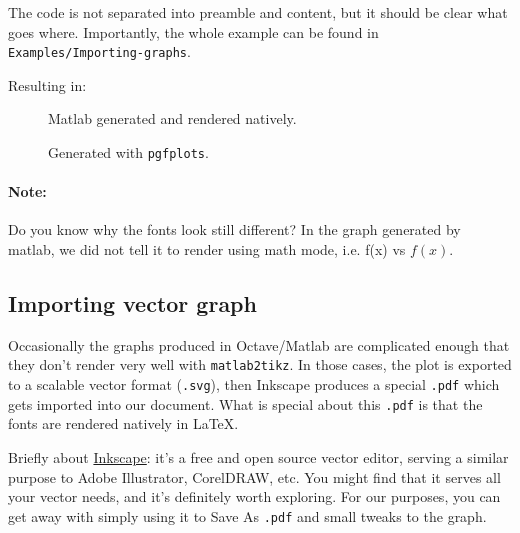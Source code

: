 The code is not separated into preamble and content, but it should be clear what goes where.
Importantly, the whole example can be found in \texttt{Examples/Importing-graphs}.

Resulting in:
\begin{figure}[h]\centering
\begin{minipage}{0.49\textwidth}
    \newlength\fheight{} \newlength\fwidth{}
    \setlength\fheight{5.5cm}
    \setlength\fwidth{7cm}    

\caption{Matlab generated and rendered natively.}
\end{minipage}
\hfill
\begin{minipage}{0.49\textwidth}
    \caption{Generated with \texttt{pgfplots}.}
\end{minipage}
\end{figure}

\paragraph{Note:}
Do you know why the fonts look still different?
In the graph generated by matlab, we did not tell it to render using math mode, i.e. f(x) vs \( f(x) \).

\subsection{Importing vector graph}
Occasionally the graphs produced in Octave/Matlab are complicated enough that they don't render very well with \texttt{matlab2tikz}.
In those cases, the plot is exported to a scalable vector format (\texttt{.svg}), then Inkscape produces a special \texttt{.pdf} which gets imported into our document.
What is special about this \texttt{.pdf} is that the fonts are rendered natively in \LaTeX.

Briefly about \href{https://inkscape.org/}{Inkscape}: it's a free and open source vector editor, serving a similar purpose to Adobe Illustrator, CorelDRAW, etc.
You might find that it serves all your vector needs, and it's definitely worth exploring.
For our purposes, you can get away with simply using it to Save As \texttt{.pdf} and small tweaks to the graph.

